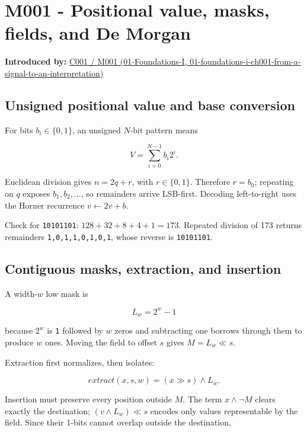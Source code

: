 \section{M001 - Positional value, masks, fields, and De Morgan}\label{03-visual-computing-i-ch018-m001---positional-value-masks-fields-and-de-morgan}

\textbf{Introduced by:} \href{../01-Foundations-I/main.pdf\#nameddest=01-foundations-i-ch001-from-a-signal-to-an-interpretation}{C001 / M001 (01-Foundations-I, 01-foundations-i-ch001-from-a-signal-to-an-interpretation)}

\subsection{Unsigned positional value and base conversion}\label{03-visual-computing-i-ch018-unsigned-positional-value-and-base-conversion}

For bits \(b_i\in\{0,1\}\), an unsigned \(N\)-bit pattern means

\[
V=\sum_{i=0}^{N-1}b_i2^i.
\]

Euclidean division gives \(n=2q+r\), with \(r\in\{0,1\}\). Therefore \(r=b_0\); repeating on \(q\) exposes \(b_1,b_2,\ldots\), so remainders arrive LSB-first. Decoding left-to-right uses the Horner recurrence \(v\leftarrow2v+b\).

Check for \texttt{10101101}: \(128+32+8+4+1=173\). Repeated division of 173 returns remainders \texttt{1,0,1,1,0,1,0,1}, whose reverse is \texttt{10101101}.

\subsection{Contiguous masks, extraction, and insertion}\label{03-visual-computing-i-ch018-contiguous-masks-extraction-and-insertion}

A width-\(w\) low mask is

\[
L_w=2^w-1
\]

because \(2^w\) is \texttt{1} followed by \(w\) zeros and subtracting one borrows through them to produce \(w\) ones. Moving the field to offset \(s\) gives \(M=L_w\ll s\).

Extraction first normalizes, then isolates:

\[
extract(x,s,w)=(x\gg s)\land L_w.
\]

Insertion must preserve every position outside \(M\). The term \(x\land\neg M\) clears exactly the destination; \((v\land L_w)\ll s\) encodes only values representable by the field. Since their 1-bits cannot overlap outside the destination,

